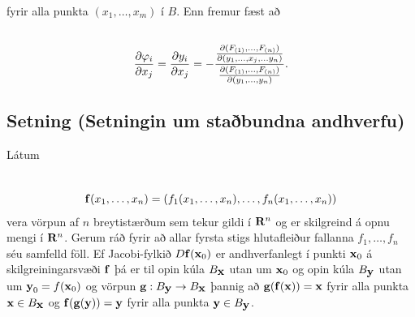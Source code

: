 \documentclass[a4paper,10pt,icelandic]{sphinxmanual}
\begin{document}
fyrir alla punkta \((x_1,\ldots,x_m)\) í \(B\). Enn fremur fæst
að
\begin{gather}
\begin{split}\displaystyle\end{split}\notag\\\begin{split}\frac{\partial \varphi_i}{\partial x_j}
=\frac{\partial y_i}{\partial x_j}
=-\frac{\frac{\partial(F_{(1)}, \ldots, F_{(n)})}
{\partial( y_1, \ldots,x_j,\ldots y_n)}}
{\frac{\partial(F_{(1)}, \ldots, F_{(n)})}{\partial( y_1, \ldots, y_n)}}.\end{split}\notag
\end{gather}

\subsection{Setning (Setningin um staðbundna andhverfu)}
\label{Kafli2:setning-setningin-um-stabundna-andhverfu}\label{Kafli2:index-29}
\begin{DUlineblock}{0em}
\item[] Látum
\end{DUlineblock}
\begin{gather}
\begin{split}\displaystyle\end{split}\notag\\\begin{split}\mbox{${\bf f}$}(x_1,\ldots,
x_n)=(f_1(x_1,\ldots,x_n),\ldots,f_n(x_1,\ldots,x_n))\end{split}\notag
\end{gather}
vera vörpun af \(n\) breytistærðum sem tekur gildi í
\(\mbox{${\bf R}^n$}\) og er skilgreind á opnu mengi í
\(\mbox{${\bf R}^n$}\). Gerum ráð fyrir að allar fyrsta stigs
hlutafleiður fallanna \(f_1, \ldots, f_n\) séu samfelld föll. Ef
Jacobi-fylkið \(D\mbox{${\bf f}$}(\mbox{${\bf x}$}_0)\) er
andhverfanlegt í punkti \(\mbox{${\bf x}$}_0\) á skilgreiningarsvæði
\(\mbox{${\bf f}$}\) þá er til opin kúla
\(B_{\mbox{${\bf x}$}}\) utan um \(\mbox{${\bf x}$}_0\) og opin
kúla \(B_{\mbox{${\bf y}$}}\) utan um
\(\mbox{${\bf y}$}_0=f(\mbox{${\bf x}$}_0)\) og vörpun
\textbar{} \(\mbox{${\bf g}$}:B_{\mbox{${\bf y}$}}\rightarrow B_{\mbox{${\bf x}$}}\)
þannig að
\(\mbox{${\bf g}$}(\mbox{${\bf f}$}(\mbox{${\bf x}$}))=\mbox{${\bf x}$}\)
fyrir alla punkta \(\mbox{${\bf x}$}\in B_{\mbox{${\bf x}$}}\) og
\(\mbox{${\bf f}$}(\mbox{${\bf g}$}(\mbox{${\bf y}$}))=\mbox{${\bf y}$}\)
fyrir alla punkta \(\mbox{${\bf y}$}\in B_{\mbox{${\bf y}$}}\).
\end{document}

